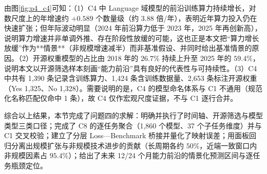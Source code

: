 由图\ref{fig:p4_c4}可知：（1）C4 中 Language 域模型的前沿训练算力持续增长，对数尺度上的年增速约 $+0.589$ 个数量级（约 $3.88$ 倍/年），表明近年算力投入仍在快速扩张；但年际波动明显（2024 年前沿算力低于 2023 年，2025 年再创新高），说明算力增速并非单调外推、存在阶段性放缓的可能，这也正是本文把“算力增长放缓”作为**情景**（非规模增速减半）而非基准假设、并同时给出基准情景的原因。（2）开源权重模型的占比由 2018 年的 $26.7\%$ 持续上升至 2025 年的 $59.4\%$，说明本文以开源筛选样本刻画“能力前沿”具有良好的代表性与可持续性。（3）C4 中共有 1{,}390 条记录含训练算力、1{,}424 条含训练数据量、2{,}653 条标注开源权重（Yes 1{,}325、No 1{,}328）。需要说明的是，C4 的模型命名体系与 C1 不通用（规范化名称匹配仅命中 1 条），故 C4 仅作宏观尺度证据，不与 C1 逐行合并。

综合以上结果，本节完成了问题四的求解：明确并执行了时间轴、开源筛选与模型类型三类口径；完成了 C8 的逐任务聚合（1{,}860 个模型、37 个子任务维度）并与 C1 交叉校验；建立了分层 Loss—Benchmark 桥接并量化了映射误差；用面板回归分离出规模扩张与非规模技术进步的贡献（长周期各约 $50\%$，近端一致窗口内非规模因素占 $95.4\%$）；给出了未来 12/24 个月能力前沿的情景化预测区间与逐任务瓶颈定位。
